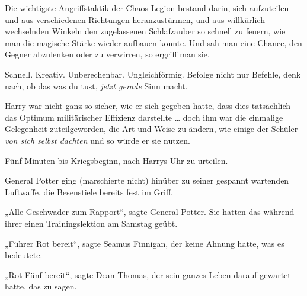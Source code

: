 Die wichtigste Angriffstaktik der Chaos-Legion bestand darin, sich aufzuteilen und aus verschiedenen Richtungen heranzustürmen, und aus willkürlich wechselnden Winkeln den zugelassenen Schlafzauber so schnell zu feuern, wie man die magische Stärke wieder aufbauen konnte. Und sah man eine Chance, den Gegner abzulenken oder zu verwirren, so ergriff man sie.

Schnell. Kreativ. Unberechenbar. Ungleichförmig. Befolge nicht nur Befehle, denk nach, ob das was du tust, \emph{jetzt gerade} Sinn macht.

Harry war nicht ganz so sicher, wie er sich gegeben hatte, dass dies tatsächlich das Optimum militärischer Effizienz darstellte … doch ihm war die einmalige Gelegenheit zuteilgeworden, die Art und Weise zu ändern, wie einige der Schüler \emph{von sich selbst dachten} und so würde er sie nutzen.

Fünf Minuten bis Kriegsbeginn, nach Harrys Uhr zu urteilen.

General Potter ging (marschierte nicht) hinüber zu seiner gespannt wartenden Luftwaffe, die Besenstiele bereits fest im Griff.

„Alle Geschwader zum Rapport“, sagte General Potter. Sie hatten das während ihrer einen Trainingslektion am Samstag geübt.

„Führer Rot bereit“, sagte Seamus Finnigan, der keine Ahnung hatte, was es bedeutete.

„Rot Fünf bereit“, sagte Dean Thomas, der sein ganzes Leben darauf gewartet hatte, das zu sagen.

